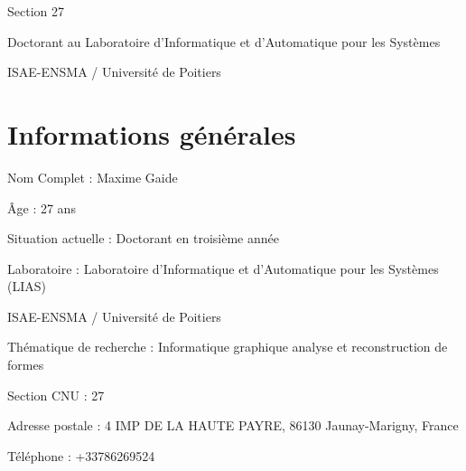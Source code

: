 \documentclass[11pt,a4paper,oneside]{article}
\begin{document}
\begin{titlepage}

	\vspace*{5.5cm}

	\begin{center}


		\vspace{1.5cm}

		{\huge Section 27}

		\vspace{2.5cm}


		\vspace{1.5cm}

		\noindent {\Large \today}

	\end{center}

	\vfill

	\noindent Doctorant au Laboratoire d'Informatique et d'Automatique pour les Systèmes

	\noindent ISAE-ENSMA / Université de Poitiers

\end{titlepage}



\newpage

\section{Informations générales}

\noindent Nom Complet : Maxime Gaide

\noindent Âge : 27 ans

\noindent Situation actuelle : Doctorant en troisième année

\noindent Laboratoire : \tabto{2.35cm}Laboratoire d'Informatique et d'Automatique pour les Systèmes (LIAS)

\noindent \tabto{2.35cm}  ISAE-ENSMA / Université de Poitiers

\noindent Thématique de recherche : Informatique graphique analyse et reconstruction de formes

\noindent Section CNU : 27

\noindent Adresse postale : 4 IMP DE LA HAUTE PAYRE, 86130 Jaunay-Marigny, France

\noindent Téléphone : +33786269524
\end{document}
